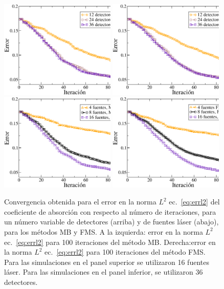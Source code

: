 \begin{figure}[h!]
\centering
  \includegraphics[width=0.49\textwidth]{figuras/detsSweep.eps}
  \includegraphics[width=0.49\textwidth]{figuras/detsMSS.eps}
\\
    \vspace{0.3cm}
  \includegraphics[width=0.49\textwidth]{figuras/sourcesSweep.eps}
  \includegraphics[width=0.49\textwidth]{figuras/sourcesMSS.eps}
  \caption{Convergencia obtenida para el error en la norma $L^2$ ec.~\eqref{eq:errl2} 
  del coeficiente de absorción con respecto al número de iteraciones, 
  para un número variable de detectores (arriba) y de fuentes láser (abajo), para los métodos 
  MB y FMS. 
   A la izquierda: 
  error en la norma $L^2$ ec.~\eqref{eq:errl2} para 100 iteraciones del método MB. 
  Derecha:error en la norma $L^2$ ec.~\eqref{eq:errl2} para 100 iteraciones del método FMS. 
  Para las simulaciones en el panel superior se utilizaron 16 fuentes láser. Para 
  las simulaciones en el panel inferior, se utilizaron 36 detectores.}
 \label{fig:itdet}
\end{figure}

